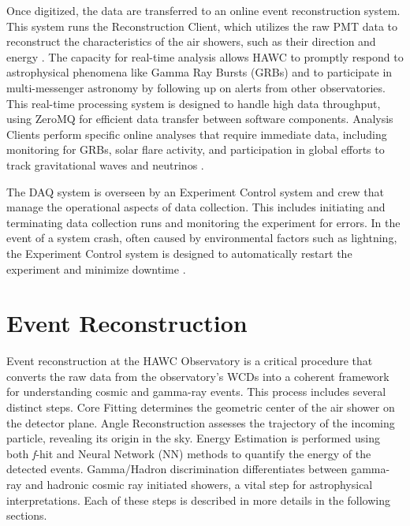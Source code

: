 Once digitized, the data are transferred to an online event reconstruction system.
This system runs the Reconstruction Client, which utilizes the raw PMT data to reconstruct the characteristics of the air showers, such as their direction and energy \cite{HAWC_DAQ_NIM}.
The capacity for real-time analysis allows HAWC to promptly respond to astrophysical phenomena like Gamma Ray Bursts (GRBs) and to participate in multi-messenger astronomy by following up on alerts from other observatories.
This real-time processing system is designed to handle high data throughput, using ZeroMQ \cite{zeromq} for efficient data transfer between software components.
Analysis Clients perform specific online analyses that require immediate data, including monitoring for GRBs, solar flare activity, and participation in global efforts to track gravitational waves and neutrinos \cite{HAWC_NIM}.

The DAQ system is overseen by an Experiment Control system and crew that manage the operational aspects of data collection.
This includes initiating and terminating data collection runs and monitoring the experiment for errors.
In the event of a system crash, often caused by environmental factors such as lightning, the Experiment Control system is designed to automatically restart the experiment and minimize downtime \cite{HAWC_NIM,HAWC_DAQ_NIM}.

\section{Event Reconstruction} \label{sec:hawc_reconstruction}

Event reconstruction at the HAWC Observatory is a critical procedure that converts the raw data from the observatory's WCDs into a coherent framework for understanding cosmic and gamma-ray events.
This process includes several distinct steps.
Core Fitting determines the geometric center of the air shower on the detector plane.
Angle Reconstruction assesses the trajectory of the incoming particle, revealing its origin in the sky.
Energy Estimation is performed using both \textit{f}-hit and Neural Network (NN) methods to quantify the energy of the detected events.
Gamma/Hadron discrimination differentiates between gamma-ray and hadronic cosmic ray initiated showers, a vital step for astrophysical interpretations.
Each of these steps is described in more details in the following sections.

